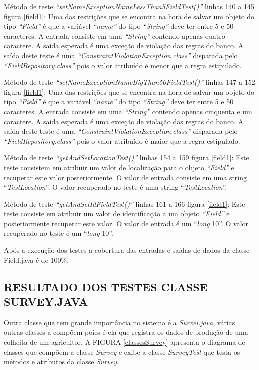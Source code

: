 Método de teste \textit{“setNameExceptionNameLessThan5FieldTest()”} linhas 140 a 145 figura \ref{field1}: Uma das restrições que se encontra na hora de salvar um objeto do tipo \textit{“Field” }é que a variável\textit{ “name”} do tipo \textit{“String” }deve ter entre 5 e 50 caracteres. A entrada consiste em uma\textit{ “String”} contendo apenas quatro caractere. A saída esperada é uma exceção de violação das regras do banco. A saída deste teste é uma \textit{“ConstraintViolationException.class” }disparada pelo\textit{ “FieldRepository.class”} pois o valor atribuído é menor que a regra estipulado.

Método de teste \textit{“setNameExceptionNameBigThan50FieldTest()”} linhas 147 a 152 figura \ref{field1}: Uma das restrições que se encontra na hora de salvar um objeto do tipo\textit{ “Field”} é que a variável \textit{“name”} do tipo\textit{ “String”} deve ter entre 5 e 50 caracteres. A entrada consiste em uma \textit{“String” }contendo apenas cinquenta e um caractere. A saída esperada é uma exceção de violação das regras do banco. A saída deste teste é uma\textit{ “ConstraintViolationException.class”} disparada pelo\textit{ “FieldRepository.class”} pois o valor atribuído é maior que a regra estipulado.

Método de teste \textit{“getAndSetLocationTest()”} linhas 154 a 159 figura \ref{field1}: Este teste consistem em atribuir um valor de localização para o objeto \textit{“Field”} e recuperar este valor posteriormente. O valor de entrada consiste em uma string “\textit{TestLocation}”. O valor recuperado no teste é uma string “\textit{TestLocation}”.

Método de teste \textit{“getAndSetIdFieldTest()”} linhas 161 a 166 figura \ref{field1}: Este teste consiste em atribuir um valor de identificação a um objeto\textit{ “Field”} e posteriormente recuperar este valor. O valor de entrada é um “\textit{long} 10”. O valor recuperado no teste é um “\textit{long} 10”.

Após a execução dos testes a cobertura das entradas e saídas de dados da classe Field.java é de 100\%. 


\subsection{RESULTADO DOS TESTES CLASSE SURVEY.JAVA}

Outra classe que tem grande importância no sistema é a \textit{Survei.java}, várias outras classes a compõem poies é ela que registra os dados de produção de uma colheita de um agricultor. A FIGURA \ref{classesSurvey} apresenta o diagrama de classes que compõem a classe \textit{Survey} e exibe a classe \textit{SurveyTest} que testa os métodos e atributos  da classe \textit{Survey}.


